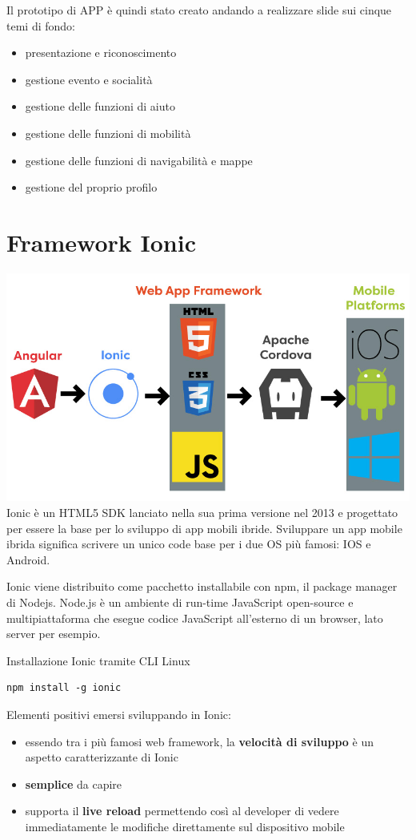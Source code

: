 Il prototipo di APP è quindi stato creato andando a realizzare slide sui cinque temi di fondo:
\begin{itemize}
\item presentazione e riconoscimento
\item gestione evento e socialità
\item gestione delle funzioni di aiuto
\item gestione delle funzioni di mobilità
\item gestione delle funzioni di navigabilità e mappe
\item gestione del proprio profilo
\end{itemize}

\section{Framework Ionic}
\includegraphics[scale=0.50]{img/cap2/angular-ionic}\\
Ionic è un HTML5 SDK lanciato nella sua prima versione nel 2013 e progettato per essere la base per lo sviluppo di app mobili ibride. 
Sviluppare un app mobile ibrida significa scrivere un unico code base per i due OS più famosi: IOS e Android.

Ionic viene distribuito come pacchetto installabile con npm, il package manager di Nodejs.
Node.js è un ambiente di run-time JavaScript open-source e multipiattaforma che esegue codice JavaScript all'esterno di un browser, lato server per esempio.

Installazione Ionic tramite CLI Linux
\begin{lstlisting}
npm install -g ionic
\end{lstlisting}

Elementi positivi emersi sviluppando in Ionic:
\begin{itemize}
    \item essendo tra i più famosi web framework, la \textbf{velocità di sviluppo} è un aspetto caratterizzante di Ionic
    \item \textbf{semplice} da capire
    \item supporta il \textbf{live reload} permettendo così al developer di vedere immediatamente le modifiche direttamente sul dispositivo mobile
\end{itemize}
    
